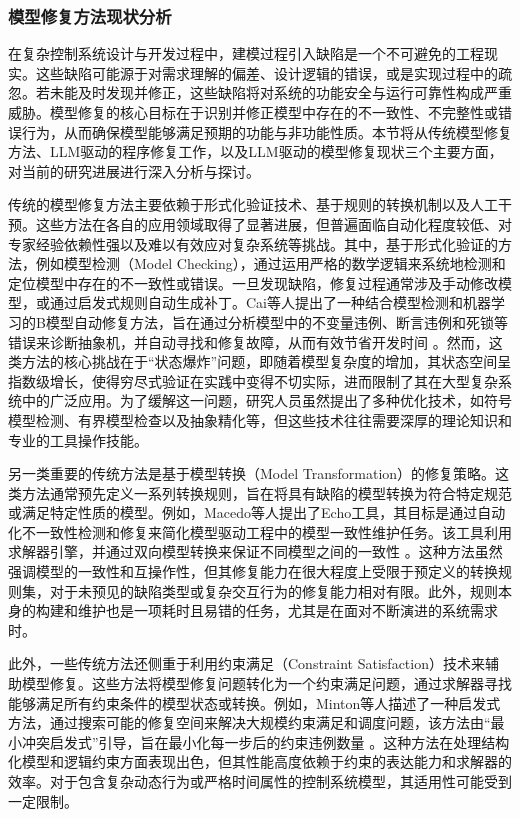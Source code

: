 \subsubsection{模型修复方法现状分析}

在复杂控制系统设计与开发过程中，建模过程引入缺陷是一个不可避免的工程现实。这些缺陷可能源于对需求理解的偏差、设计逻辑的错误，或是实现过程中的疏忽。若未能及时发现并修正，这些缺陷将对系统的功能安全与运行可靠性构成严重威胁。模型修复的核心目标在于识别并修正模型中存在的不一致性、不完整性或错误行为，从而确保模型能够满足预期的功能与非功能性质。本节将从传统模型修复方法、LLM驱动的程序修复工作，以及LLM驱动的模型修复现状三个主要方面，对当前的研究进展进行深入分析与探讨。

传统的模型修复方法主要依赖于形式化验证技术、基于规则的转换机制以及人工干预。这些方法在各自的应用领域取得了显著进展，但普遍面临自动化程度较低、对专家经验依赖性强以及难以有效应对复杂系统等挑战。其中，基于形式化验证的方法，例如模型检测（Model Checking），通过运用严格的数学逻辑来系统地检测和定位模型中存在的不一致性或错误。一旦发现缺陷，修复过程通常涉及手动修改模型，或通过启发式规则自动生成补丁。Cai等人提出了一种结合模型检测和机器学习的B模型自动修复方法，旨在通过分析模型中的不变量违例、断言违例和死锁等错误来诊断抽象机，并自动寻找和修复故障，从而有效节省开发时间 。然而，这类方法的核心挑战在于“状态爆炸”问题，即随着模型复杂度的增加，其状态空间呈指数级增长，使得穷尽式验证在实践中变得不切实际，进而限制了其在大型复杂系统中的广泛应用。为了缓解这一问题，研究人员虽然提出了多种优化技术，如符号模型检测、有界模型检查以及抽象精化等，但这些技术往往需要深厚的理论知识和专业的工具操作技能。

另一类重要的传统方法是基于模型转换（Model Transformation）的修复策略。这类方法通常预先定义一系列转换规则，旨在将具有缺陷的模型转换为符合特定规范或满足特定性质的模型。例如，Macedo等人提出了Echo工具，其目标是通过自动化不一致性检测和修复来简化模型驱动工程中的模型一致性维护任务。该工具利用求解器引擎，并通过双向模型转换来保证不同模型之间的一致性 。这种方法虽然强调模型的一致性和互操作性，但其修复能力在很大程度上受限于预定义的转换规则集，对于未预见的缺陷类型或复杂交互行为的修复能力相对有限。此外，规则本身的构建和维护也是一项耗时且易错的任务，尤其是在面对不断演进的系统需求时。

此外，一些传统方法还侧重于利用约束满足（Constraint Satisfaction）技术来辅助模型修复。这些方法将模型修复问题转化为一个约束满足问题，通过求解器寻找能够满足所有约束条件的模型状态或转换。例如，Minton等人描述了一种启发式方法，通过搜索可能的修复空间来解决大规模约束满足和调度问题，该方法由“最小冲突启发式”引导，旨在最小化每一步后的约束违例数量 。这种方法在处理结构化模型和逻辑约束方面表现出色，但其性能高度依赖于约束的表达能力和求解器的效率。对于包含复杂动态行为或严格时间属性的控制系统模型，其适用性可能受到一定限制。

